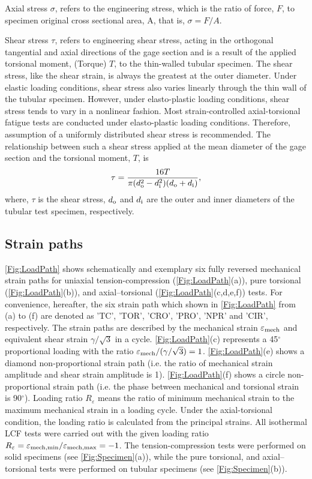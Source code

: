 Axial stress $\sigma$, refers to the engineering stress, which is the ratio of force, $F$, to specimen original cross sectional area, A, that is, $\sigma=F/A$.

Shear stress $\tau$, refers to engineering shear stress, acting in the orthogonal tangential and axial directions of the gage section and is a result of the applied torsional moment, (Torque) $T$, to the thin-walled tubular specimen. The shear stress, like the shear strain, is always the greatest at the outer diameter. Under elastic loading conditions, shear stress also varies linearly through the thin wall of the tubular specimen. However, under elasto-plastic loading conditions, shear stress tends to vary in a nonlinear fashion. Most strain-controlled axial-torsional fatigue tests are conducted under elasto-plastic loading conditions. Therefore, assumption of a uniformly distributed shear stress is recommended. The relationship between such a shear stress applied at the mean diameter of the gage section and the torsional moment, $T$, is
\begin{equation}
\tau=\frac{16T}{\pi(d_{\rm{o}}^2-d_{\rm{i}}^2)(d_{\rm{o}}+d_{\rm{i}})},
\label{Equ:shear_stress}
\end{equation}
where, $\tau$ is the shear stress, $d_{\rm{o}}$ and $d_{\rm{i}}$ are the outer and inner diameters of the tubular test specimen, respectively.

\subsection{Strain paths}
\noindent
\ref{Fig:LoadPath} shows schematically and exemplary six fully reversed mechanical strain paths for uniaxial tension-compression (\ref{Fig:LoadPath}(a)), pure torsional (\ref{Fig:LoadPath}(b)), and axial–torsional (\ref{Fig:LoadPath}(c,d,e,f)) tests.
For convenience, hereafter, the six strain path which shown in \ref{Fig:LoadPath} from (a) to (f) are denoted as 'TC', 'TOR', 'CRO', 'PRO', 'NPR' and 'CIR', respectively.
The strain paths are described by the mechanical strain $\varepsilon_{\rm{mech}}$ and equivalent shear strain $\gamma/\sqrt{3}$ in a cycle.
\ref{Fig:LoadPath}(c) represents a 45$^\circ$ proportional loading with the ratio $\varepsilon_{\rm{mech}}/(\gamma/\sqrt{3})=1$. \ref{Fig:LoadPath}(e) shows a diamond non-proportional strain path (i.e. the ratio of mechanical strain amplitude and shear strain amplitude is 1). \ref{Fig:LoadPath}(f) shows a circle non-proportional strain path (i.e. the phase between mechanical and torsional strain is 90$^\circ$).
Loading ratio $R_\varepsilon$ means the ratio of minimum mechanical strain to the maximum mechanical strain in a loading cycle. Under the axial-torsional condition, the loading ratio is calculated from the principal strains.
All isothermal LCF tests were carried out with the given loading ratio $R_{\varepsilon}=\varepsilon_{{\rm{mech}},\min}/\varepsilon_{{\rm{mech}},\max}=-1$.
The tension-compression tests were performed on solid specimens (see \ref{Fig:Specimen}(a)), while the pure torsional, and axial–torsional tests were performed on tubular specimens (see \ref{Fig:Specimen}(b)).

